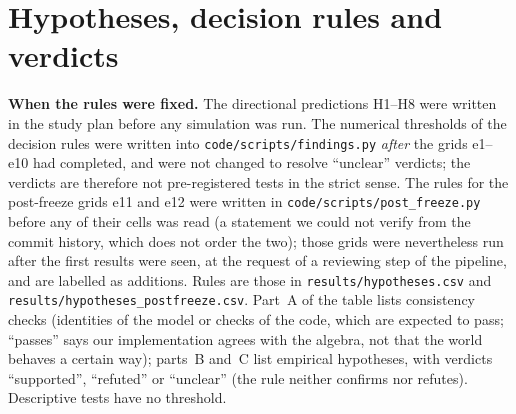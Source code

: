 \section{Hypotheses, decision rules and verdicts}
\label{app:hyp}
\textbf{When the rules were fixed.} The directional predictions H1--H8 were written in the study plan before any simulation was run. The numerical thresholds of the decision rules were written into \texttt{code/scripts/findings.py} \emph{after} the grids e1--e10 had completed, and were not changed to resolve ``unclear'' verdicts; the verdicts are therefore not pre-registered tests in the strict sense. The rules for the post-freeze grids e11 and e12 were written in \texttt{code/scripts/post\_freeze.py} before any of their cells was read (a statement we could not verify from the commit history, which does not order the two); those grids were nevertheless run after the first results were seen, at the request of a reviewing step of the pipeline, and are labelled as additions. Rules are those in \texttt{results/hypotheses.csv} and \texttt{results/hypotheses\_postfreeze.csv}. Part~A of the table lists consistency checks (identities of the model or checks of the code, which are expected to pass; ``passes'' says our implementation agrees with the algebra, not that the world behaves a certain way); parts~B and~C list empirical hypotheses, with verdicts ``supported'', ``refuted'' or ``unclear'' (the rule neither confirms nor refutes). Descriptive tests have no threshold.
{\scriptsize}

